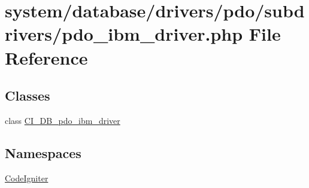\hypertarget{pdo__ibm__driver_8php}{}\section{system/database/drivers/pdo/subdrivers/pdo\+\_\+ibm\+\_\+driver.php File Reference}
\label{pdo__ibm__driver_8php}
\subsection*{Classes}
\begin{DoxyCompactItemize}
\item 
class \mbox{\hyperlink{class_c_i___d_b__pdo__ibm__driver}{C\+I\+\_\+\+D\+B\+\_\+pdo\+\_\+ibm\+\_\+driver}}
\end{DoxyCompactItemize}
\subsection*{Namespaces}
\begin{DoxyCompactItemize}
\item 
 \mbox{\hyperlink{namespace_code_igniter}{Code\+Igniter}}
\end{DoxyCompactItemize}
